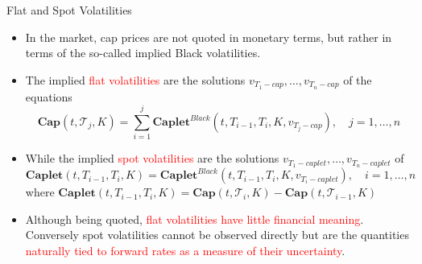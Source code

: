 \documentclass{beamer}
\begin{document}

\begin{frame}{Flat and Spot Volatilities}
	\begin{itemize}
		\item<1-> In the market, cap prices are not quoted in monetary terms, but rather in terms of the so-called implied Black volatilities. 
		\item<2-> The implied \textcolor{red}{flat volatilities} are the solutions $v_{T_1-cap},\ldots, v_{T_n-cap}$ of the equations
		\begin{equation*}
			\textbf{Cap}(t, \mathcal{T}_j, K) = \sum_{i=1}^j \textbf{Caplet}^{Black}(t, T_{i-1}, T_i,K,v_{T_j-cap}),\quad j=1, \ldots,n
		\end{equation*}
		\item<3-> While the implied \textcolor{red}{spot volatilities} are the solutions $v_{T_1-caplet},\ldots, v_{T_n-caplet}$ of
		\begin{equation*}
			\textbf{Caplet}(t, T_{i-1},T_i,K) = \textbf{Caplet}^{Black}(t, T_{i-1}, T_i,K,v_{T_i-caplet}),\quad i=1, \ldots,n
		\end{equation*} 
		where $\textbf{Caplet}(t, T_{i-1}, T_i, K) = \textbf{Cap}(t, \mathcal{T}_i,K)-\textbf{Cap}(t, \mathcal{T}_{i-1},K)$
		\item<4-> Although being quoted, \textcolor{red}{flat volatilities have little financial meaning}. Conversely spot volatilities cannot be observed directly but are the quantities \textcolor{red}{naturally tied to forward rates as a measure of their uncertainty}.
		\end{itemize}
\end{frame}
\end{document}
